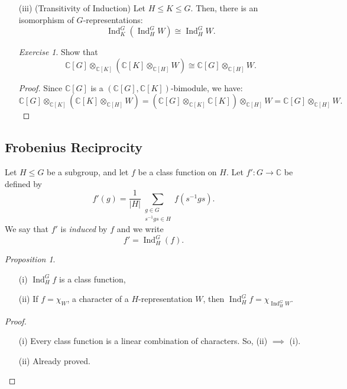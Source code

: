 \documentclass[a4paper]{report}
\theoremstyle{definition}
\theoremstyle{remark}
\theoremstyle{proposition}
\newtheorem{proposition}{Proposition}
\theoremstyle{conjecture}
\theoremstyle{lemma}
\theoremstyle{corollary}
\theoremstyle{exercise}
\newtheorem{exercise}{Exercise}
\theoremstyle{example}
\newcommand{\C}{\mathbb{C}}
\newcommand{\on}{\operatorname}
\begin{document}
\begin{itemize}
\begin{proof}
            Then, by associativity of tensor products, we thus 
            have an isomorphism:
            $$V \otimes_\C (\C[G]\otimes_{\C[H]}W) \cong \C[G]\otimes_{\C[H]}(V\otimes_\C W).$$
        \end{proof}
    \item[(iii)] (Transitivity of Induction) 
        Let $H\leq K \leq G$. Then, there is an isomorphism of 
        $G$-representations:
        $$\on{Ind}_K^G(\on{Ind}_H^GW) \cong \on{Ind}_H^GW.$$
        \begin{exercise}
            Show that $$\C[G] \otimes_{\C[K]}(\C[K] \otimes_{\C[H]} W) \cong \C[G] \otimes_{\C[H]} W.$$
        \end{exercise}
        \begin{proof}
            Since $\C[G]$ is a $(\C[G],\C[K])$-bimodule, we have:
            $$\C[G]\otimes_{\C[K]}(\C[K] \otimes_{\C[H]} W) = (\C[G] \otimes_{\C[K]} \C[K]) \otimes_{\C[H]} W = \C[G]\otimes_{\C[H]} W.$$
        \end{proof}
\end{itemize}

\subsection{Frobenius Reciprocity}

Let $H\leq G$ be a subgroup, and let $f$ be a class function on $H$.
Let $f ' : G \to \C$ be defined by 
$$f'(g) = \frac{1}{\vert H\vert} \sum_{\substack{g \in G\\ s^{-1}gs\in H}} f(s^{-1}gs).$$
We say that $f'$ is \emph{induced} by $f$ and we write 
$$f' = \on{Ind}_H^G (f).$$

\begin{proposition}
    \leavevmode
    \begin{itemize}
        \item[(i)] $\on{Ind}_H^Gf$ is a class function,
        \item[(ii)] If $f = \chi_W$, a character of a $H$-representation $W$,
            then $\on{Ind}_H^G f = \chi_{\on{Ind}_H^GW}$.
    \end{itemize}
\end{proposition}

\begin{proof}
    \leavevmode
    \begin{itemize}
        \item[(i)] Every class function is a linear combination of characters.
            So, (ii) $\implies$ (i).
        \item[(ii)] Already proved.
    \end{itemize}
\end{proof}
\end{document}
